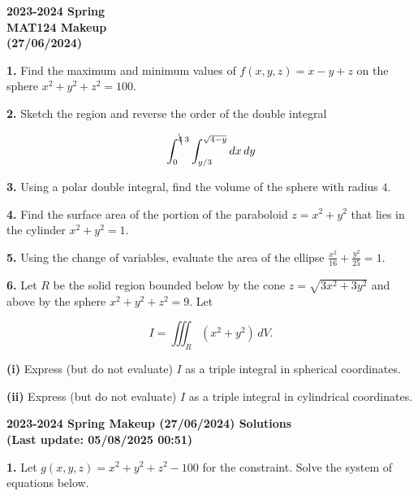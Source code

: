 \documentclass{article}
\begin{document}
\pagestyle{empty}
\large

\begin{center}
\textbf{2023-2024 Spring \\MAT124 Makeup\\(27/06/2024)}
\end{center}

\textbf{1.} Find the maximum and minimum values of $f(x,y,z)=x-y+z$ on the sphere $x^2+y^2+z^2=100$.

\vspace{1em}

\textbf{2.} Sketch the region and reverse the order of the double integral

\[\int_0^{\bcancel4\:3}\int_{y/3}^{\sqrt{4-y}}dx\,dy\]

\vspace{1em}

\textbf{3.} Using a polar double integral, find the volume of the sphere with radius $4$.

\vspace{1em}

\textbf{4.} Find the surface area of the portion of the paraboloid $z=x^2+y^2$ that lies in the cylinder $x^2+y^2=1$.

\vspace{1em}

\textbf{5.} Using the change of variables, evaluate the area of the ellipse $\displaystyle\frac{x^2}{16}+\frac{y^2}{25}=1$.

\vspace{1em}

\textbf{6.} Let $R$ be the solid region bounded below by the cone $z=\sqrt{3x^2+3y^2}$ and above by the sphere $x^2+y^2+z^2=9$. Let

\[{I}=\iiint_R(x^2+y^2)\,dV.\]

\textbf{(i)} Express (but do not evaluate) ${I}$ as a triple integral in spherical coordinates.

\textbf{(ii)} Express (but do not evaluate) ${I}$ as a triple integral in cylindrical coordinates.

\newpage

\begin{center}
\textbf{2023-2024 Spring Makeup (27/06/2024) Solutions\\
(Last update: 05/08/2025 00:51)}
\end{center}

\textbf{1.} Let $g(x,y,z)=x^2+y^2+z^2-100$ for the constraint. Solve the system of equations below.
\end{document}
